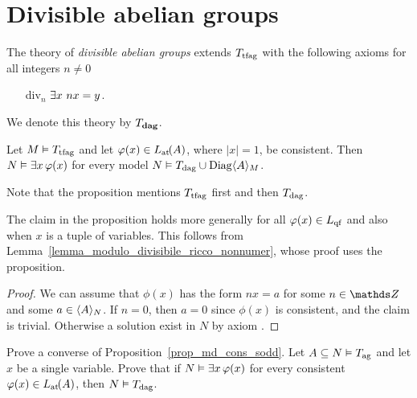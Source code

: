\documentclass[creche.tex]{subfiles}
\begin{document}

\section{Divisible abelian groups}

The theory of \emph{divisible abelian groups\/} extends $T_{\rm tfag}$ with the following axioms for all  integers $n\neq0$
\begin{itemize}
\item[div$_n$] $\E x\ nx=y$.
\end{itemize} 
We denote this theory by \emph{$T_{\rm\bf dag}$}.

\begin{proposition}\label{prop_md_cons_sodd}
Let $M\models T_{\rm tfag}$ and let $\phi(x)\in\atL(A)$, where $|x|=1$, be consistent. Then $N\models\E x \,\phi(x)$ for every model $N\models T_{\rm dag}\cup\Diag\<A\>_M$.
\end{proposition}

Note that the proposition mentions $T_{\rm tfag}$ first and then $T_{\rm dag}$. 

The claim in the proposition holds more generally for all $\phi(x)\in L_{\rm qf}$ and also when $x$ is a tuple of variables. This follows from Lemma~\ref{lemma_modulo_divisibile_ricco_nonnumer}, whose proof uses the proposition.

\begin{proof}
We can assume that $\phi(x)$ has the form $n x= a$ for some $n\in\ZZ$ and some $a\in\<A\>_N$. If $n=0$, then $a=0$ since $\phi(x)$ is consistent, and the claim is trivial. Otherwise a solution exist in $N$ by axiom .
\end{proof}

\begin{exercise}
Prove a converse of Proposition~\ref{prop_md_cons_sodd}. Let $A\subseteq N\models T_{\rm ag}$ and let $x$ be a single variable. Prove that if $N\models\E x \,\phi(x)$ for every consistent $\phi(x)\in\atL(A)$, then $N\models T_{\rm dag}$.\QED
\end{exercise}
\end{document}
